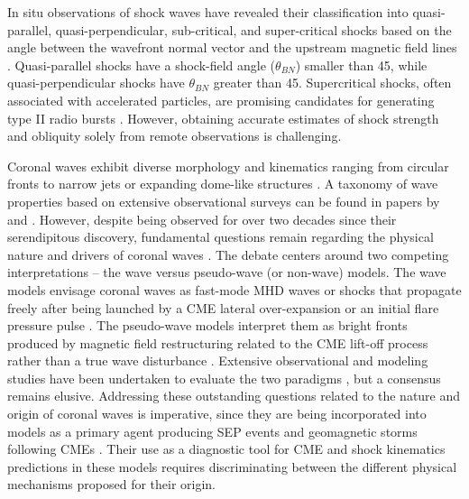 In situ observations of shock waves have revealed their classification into quasi-parallel, quasi-perpendicular, sub-critical, and super-critical shocks based on the angle between the wavefront normal vector and the upstream magnetic field lines \cite{tsurutani_1985}. Quasi-parallel shocks have a shock-field angle ($\theta_{BN}$) smaller than 45\degree, while quasi-perpendicular shocks have $\theta_{BN}$ greater than 45\degree. Supercritical shocks, often associated with accelerated particles, are promising candidates for generating type II radio bursts \cite{benz_1988}. However, obtaining accurate estimates of shock strength and obliquity solely from remote observations is challenging.

Coronal waves exhibit diverse morphology and kinematics ranging from circular fronts to narrow jets or expanding dome-like structures \citep{veronig_2010}. A taxonomy of wave properties based on extensive observational surveys can be found in papers by \citet{muhr_2014} and \citet{nitta_2013}. However, despite being observed for over two decades since their serendipitous discovery, fundamental questions remain regarding the physical nature and drivers of coronal waves \citep{chen_2016, vrsnak_2008, warmuth_2015}. The debate centers around two competing interpretations -- the wave versus pseudo-wave (or non-wave) models. The wave models envisage coronal waves as fast-mode MHD waves or shocks that propagate freely after being launched by a CME lateral over-expansion or an initial flare pressure pulse \citep{wills_2007, vrsnak_2008}. The pseudo-wave models interpret them as bright fronts produced by magnetic field restructuring related to the CME lift-off process rather than a true wave disturbance \citep{delannee_1999, chen_2002}. Extensive observational and modeling studies have been undertaken to evaluate the two paradigms \citep{patsourakos_2012, long_2017}, but a consensus remains elusive. Addressing these outstanding questions related to the nature and origin of coronal waves is imperative, since they are being incorporated into models as a primary agent producing SEP events and geomagnetic storms following CMEs \citep{rouillard_2012, park_2013}. Their use as a diagnostic tool for CME and shock kinematics predictions in these models requires discriminating between the different physical mechanisms proposed for their origin.

